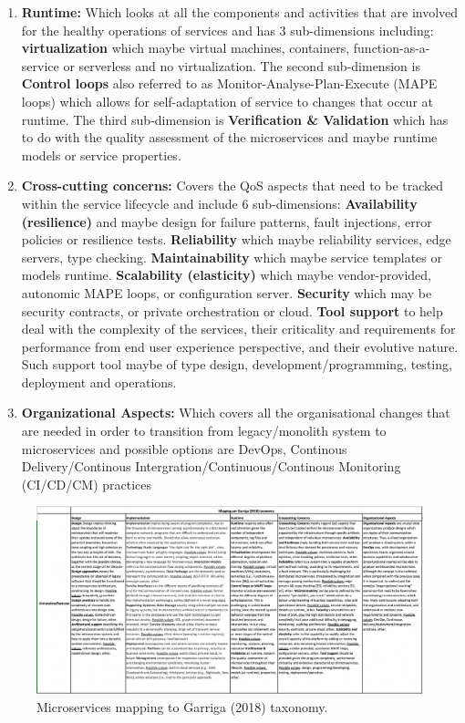 \documentclass{article}
\begin{document}
\begin{multicols}{2}
\begin{enumerate}
\item \textbf{Runtime:} 
Which looks at all the components and activities that are involved for the healthy operations of services and has 3 sub-dimensions including: \textbf{virtualization} which maybe virtual machines, containers, function-as-a-service or serverless and no virtualization. The second sub-dimension is \textbf{Control loops} also referred to as Monitor-Analyse-Plan-Execute (MAPE loops) which allows for self-adaptation of service to changes that occur at runtime. The third sub-dimension is \textbf{Verification \& Validation} which has to do with the quality assessment of the microservices and maybe runtime models or service properties.

\item \textbf{Cross-cutting concerns:}
Covers the QoS aspects that need to be tracked within the service lifecycle and include 6 sub-dimensions: \textbf{Availability (resilience)} and maybe design for failure patterns, fault injections, error policies or resilience tests. \textbf{Reliability} which maybe reliability services, edge servers, type checking. \textbf{Maintainability} which maybe service templates or models runtime. \textbf{Scalability (elasticity)} which maybe vendor-provided, autonomic MAPE loops, or configuration server. \textbf{Security} which may be security contracts, or private orchestration or cloud. \textbf{Tool support} to help deal with the complexity of the services, their criticality and requirements for performance from end user experience perspective, and their evolutive nature. Such support tool maybe of type design, development/programming, testing, deployment and operations.

\item \textbf{Organizational Aspects:}
Which covers all the organisational changes that are needed in order to transition from legacy/monolith system to microservices and possible options are DevOps, Continous Delivery/Continous Intergration/Continuous/Continous Monitoring (CI/CD/CM) practices 
 
\end{enumerate}

\begin{figure}[htbp]
 \centerline{\includegraphics[scale=0.60]{garrigataxonomy.png}}
  \caption{Microservices mapping to Garriga (2018) taxonomy.}
  \label{fig}
\end{figure}


\end{multicols}
\end{document}
